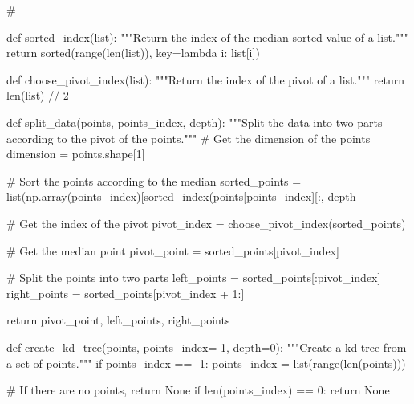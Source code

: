 \begin{Python}
    #%
    
    def sorted_index(list):
        """Return the index of the median sorted value of a list."""
        return sorted(range(len(list)), key=lambda i: list[i])

    def choose_pivot_index(list):
        """Return the index of the pivot of a list."""
        return len(list) // 2
    
    def split_data(points, points_index, depth):
        """Split the data into two parts according to the pivot of the points."""
        # Get the dimension of the points
        dimension = points.shape[1]
    
        # Sort the points according to the median
        sorted_points = list(np.array(points_index)[sorted_index(points[points_index][:, depth %
    
        # Get the index of the pivot
        pivot_index = choose_pivot_index(sorted_points)
    
        # Get the median point
        pivot_point = sorted_points[pivot_index]
    
        # Split the points into two parts
        left_points = sorted_points[:pivot_index]
        right_points = sorted_points[pivot_index + 1:]
    
        return pivot_point, left_points, right_points
    
    def create_kd_tree(points, points_index=-1, depth=0):
        """Create a kd-tree from a set of points."""
        if points_index == -1:
            points_index = list(range(len(points)))
    
        # If there are no points, return None
        if len(points_index) == 0:
            return None
\end{Python}


